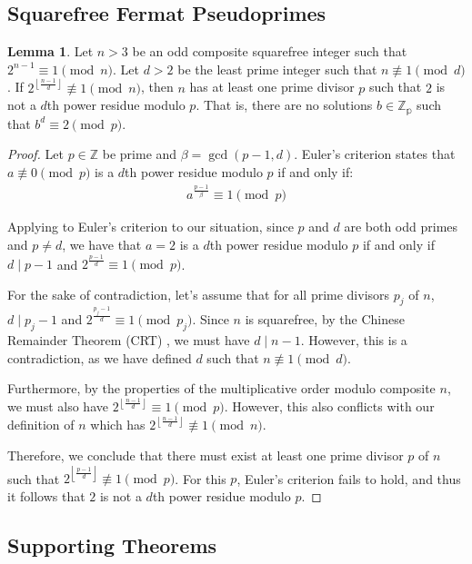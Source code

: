 \documentclass{article}
\theoremstyle{plain}
\theoremstyle{definition}
\newtheorem{lemma}{Lemma}
\newcommand{\floor}[1]{\left\lfloor #1 \right\rfloor}
\begin{document}
\subsection{Squarefree Fermat Pseudoprimes}
\begin{lemma} \label{lemma:nonresidue}
Let $n>3$ be an odd composite squarefree integer such that $2^{n-1} \equiv 1 \pmod{n}$. Let $d > 2$ be the least prime integer such that $n \not\equiv 1 \pmod{d}$. If $2^{\floor{\frac{n-1}{d}}} \not\equiv 1 \pmod{n}$, then $n$ has at least one prime divisor $p$ such that $2$ is not a $d$th power residue modulo $p$. That is, there are no solutions $b \in \mathbb{Z_p}$ such that $b^d \equiv 2 \pmod{p}$.
\end{lemma}
\begin{proof}
Let $p \in \mathbb{Z}$ be prime and $\beta = \gcd(p-1, d)$. Euler's criterion \cite{euler1914powerresidues} states that $a \not\equiv 0 \pmod p$ is a $d$th power residue modulo $p$ if and only if:
\begin{align}
a^{\frac{p-1}{\beta}} \equiv 1 \pmod p
\end{align}

Applying to Euler's criterion to our situation, since $p$ and $d$ are both odd primes and $p \not= d$, we have that $a=2$ is a $d$th power residue modulo $p$ if and only if $d \mid p-1$ and $2^{\frac{p-1}{d}} \equiv 1 \pmod p$.

For the sake of contradiction, let's assume that for all prime divisors $p_j$ of $n$, $d \mid p_j-1$ and $2^{\frac{p_j-1}{d}} \equiv 1 \pmod p_j$. Since $n$ is squarefree, by the Chinese Remainder Theorem (CRT) \cite{cormen2009algorithms}, we must have $d \mid n-1$. However, this is a contradiction, as we have defined $d$ such that $n \not\equiv 1 \pmod{d}$.

Furthermore, by the properties of the multiplicative order modulo composite $n$, we must also have $2^{\floor{\frac{n-1}{d}}} \equiv 1 \pmod p$. However, this also conflicts with our definition of $n$ which has $2^{\floor{\frac{n-1}{d}}} \not\equiv 1 \pmod n$.

Therefore, we conclude that there must exist at least one prime divisor $p$ of $n$ such that $2^{\floor{\frac{p-1}{d}}} \not\equiv 1 \pmod{p}$. For this $p$, Euler's criterion fails to hold, and thus it follows that $2$ is not a $d$th power residue modulo $p$.
\end{proof}

\subsection{Supporting Theorems}
\end{document}

